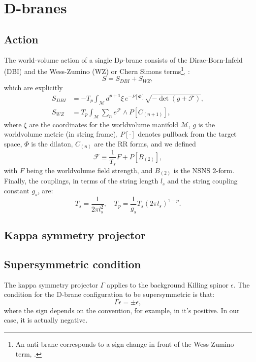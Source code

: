 \section{D-branes}

\subsection{Action}
The world-volume action of a single D$p$-brane consists of the Dirac-Born-Infeld (DBI) and the Wess-Zumino (WZ) or Chern Simons terms\footnote{An anti-brane corresponds to a sign change in front of the Wess-Zumino term, \cite{Kruczenski:2003be}.},
\cite{Ammon:2015wua}:
\begin{equation}
 S = S_{DBI} + S_{WZ},
\end{equation}
which are explicitly
\begin{align}
 S_{DBI} & = 
 -T_p \int_\mathcal{M} d^{p+1}\xi \, e^{-P[\Phi] } \sqrt{-\det (g+\mathcal{F})},\\
 S_{WZ} & =
 T_p\int _\mathcal{M} \sum_n e^{\mathcal{F}}\wedge P[C_{(n+1)}],
\end{align}
where $\xi$ are the coordinates for the worldvolume manifold $\mathcal{M}$, $g$ is the worldvolume metric (in string frame), $P[\cdot]$ denotes pullback from the target space, $\Phi$ is the dilaton, $C_{(n)}$ are the RR forms, and we defined
\begin{equation}
 \mathcal{F} \equiv \frac{1}{T_s} F + P[B_{(2)}], 
\end{equation}
with $F$ being the worldvolume field strength, and $B_{(2)}$ is the NSNS 2-form. Finally, the couplings, in terms of the string length $l_s$ and the string coupling constant $g_s$, are:
\begin{equation}
 T_{s} = \dfrac{1}{2\pi l_s^2}, \quad T_p = \dfrac{1}{g_s} T_s (2\pi l_s)^{1-p}.
\end{equation}


\subsection{Kappa symmetry projector}



\subsection{Supersymmetric condition}
The kappa symmetry projector $\Gamma$ applies to the background Killing spinor $\epsilon$. The condition for the D-brane configuration to be supersymmetric is that:
\begin{equation}
 \Gamma \epsilon = \pm \epsilon,
\end{equation}
where the sign depends on the convention, for example, in \cite{Skenderis:2002vf} it's positive. In our case, it is actually negative.



